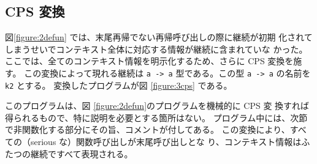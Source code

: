 
\subsection{CPS 変換}
\label{subsection:3cps}

図\ref{figure:2defun} では、末尾再帰でない再帰呼び出しの際に継続が初期
化されてしまうせいでコンテキスト全体に対応する情報が継続に含まれていな
かった。
ここでは、全てのコンテキスト情報を明示化するため、さらに CPS 変換を施
す。
この変換によって現れる継続は \texttt{a -> a} 型である。この型
\texttt{a -> a} の名前を \texttt{k2} とする。
変換したプログラムが図 \ref{figure:3cps} である。

このプログラムは、図 \ref{figure:2defun}のプログラムを機械的に CPS 変
換すれば得られるもので、特に説明を必要とする箇所はない。
プログラム中には、次節で非関数化する部分にその旨、コメントが付してある。
この変換により、すべての（serious な）関数呼び出しが末尾呼び出しとな
り、コンテキスト情報はふたつの継続ですべて表現される。

